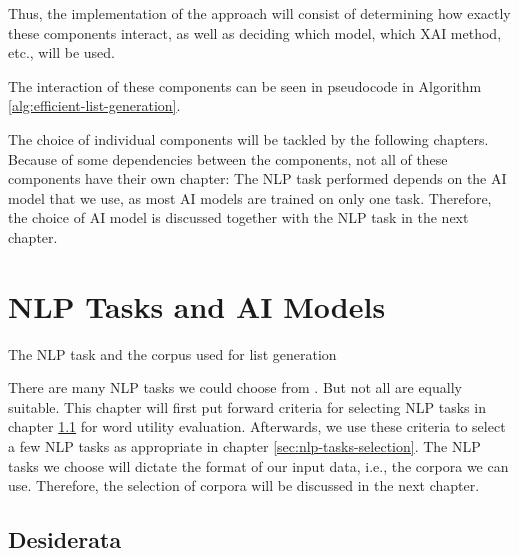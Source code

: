 Thus, the implementation of the approach will consist of determining how exactly these components interact, as well as deciding which model, which XAI method, etc., will be used.

The interaction of these components can be seen in pseudocode in Algorithm \ref{alg:efficient-list-generation}.



The choice of individual components will be tackled by the following chapters.
Because of some dependencies between the components, not all of these components have their own chapter:
The NLP task performed depends on the AI model that we use, as most AI models are trained on only one task.
Therefore, the choice of AI model is discussed together with the NLP task in the next chapter.


\section{NLP Tasks and AI Models}
The NLP task and the corpus used for list generation

There are many NLP tasks we could choose from .
But not all are equally suitable.
This chapter will first put forward criteria for selecting NLP tasks in chapter \ref{sec:nlp-tasks-desiderata} for word utility evaluation.
Afterwards, we use these criteria to select a few NLP tasks as appropriate in chapter \ref{sec:nlp-tasks-selection}.
The NLP tasks we choose will dictate the format of our input data, i.e., the corpora we can use.
Therefore, the selection of corpora will be discussed in the next chapter.

\subsection{Desiderata} \label{sec:nlp-tasks-desiderata}


